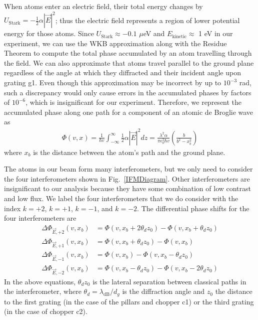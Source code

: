 \documentclass[twocolumn,prl,showpacs,superscriptaddress,longbibliography]{revtex4-1}   %
\newcommand{\figref}[1]{Fig.~\ref{#1}}
\begin{document}
When atoms enter an electric field, their total energy changes by $U_{\mathrm{Stark}} = -\frac{1}{2}\alpha|\vec{E}|^2$; thus the electric field represents a region of lower potential energy for those atoms.
Since $U_{\mathrm{Stark}} \approx -0.1$ $\mu$eV and $E_{\mathrm{kinetic}} \approx$ 1 eV in our experiment, we can use the WKB approximation along with the Residue Theorem to compute the total phase accumulated by an atom travelling through the field.
We can also approximate that atoms travel parallel to the ground plane regardless of the angle at which they diffracted and their incident angle upon grating g1. Even though this approximation may be incorrect by up to $10^{-3}$ rad, such a discrepancy would only cause errors in the accumulated phases by factors of $10^{-6}$, which is insignificant for our experiment.
Therefore, we represent the accumulated phase along one path for a component of an atomic de Broglie wave as
\begin{align}
	\Phi(v,x) = 
	\frac{1}{\hbar v} \int_{-\infty}^{\infty} \frac{1}{2} \alpha |\vec{E}|^2 dz =	
	\frac{\lambda^2 \alpha}{\pi \epsilon_0^2 \hbar v}
	\left( \frac{b}{b^2-x_b^2} \right)
	\label{accumPhasePillars}
\end{align}
where $x_b$ is the distance between the atom's path and the ground plane.

The atoms in our beam form many interferometers, but we only need to consider the four interferometers shown in \figref{IFMDiagram}. 
Other interferometers are insignificant to our analysis because they have some combination of low contrast and low flux.
We label the four interferometers that we do consider with the index $k=+2$, $k=+1$, $k=-1$, and $k=-2$. 
The differential phase shifts for the four interferometers are
\begin{align}
	\Delta\Phi_{\vec{E},+2}(v,x_b) &= \Phi(v, x_b+2\theta_d z_0) - \Phi(v, x_b+\theta_d z_0) \nonumber \\
	\Delta\Phi_{\vec{E},+1}(v,x_b) &= \Phi(v, x_b+\theta_d z_0) - \Phi(v, x_b) \nonumber \\
	\Delta\Phi_{\vec{E},-1}(v,x_b) &= \Phi(v, x_b) - \Phi(v, x_b-\theta_d z_0) \nonumber \\
	\Delta\Phi_{\vec{E},-2}(v,x_b) &= \Phi(v, x_b-\theta_d z_0) - \Phi(v, x_b-2\theta_d z_0)
	\label{deltaPhasePillars}
\end{align}
In the above equations, $\theta_d z_0$ is the lateral separation between classical paths in the interferometer, where $\theta_d = \lambda_{\mathrm{dB}} / d_g$ is the diffraction angle and $z_0$ the distance to 
the first grating (in the case of the pillars and chopper c1) or the third grating (in the case of chopper c2).
\end{document}
